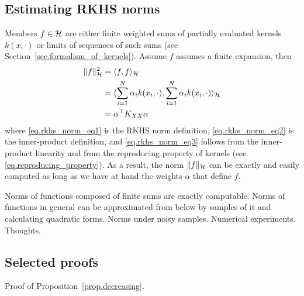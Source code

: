 \subsection{Estimating RKHS norms}

Members $f \in \mathcal{H}$ are either finite weighted sums of partially evaluated kernels $k(x,\cdot)$ or limits of sequences of such sums (see Section~\ref{sec.formalism_of_kernels}). Assume $f$ assumes a finite expansion, then
\begin{align}
	\Vert f \Vert_{\mathcal{H}}^2 &= \langle f, f \rangle_{\mathcal{H}} \label{eq.rkhs_norm_eq1} \\
	&= \langle \sum_{i=1}^N \alpha_i k(x_i,\cdot), \sum_{i=1}^N \alpha_i k(x_i,\cdot) \rangle_{\mathcal{H}} \label{eq.rkhs_norm_eq2} \\
	&= \alpha^\top K_{XX} \alpha \label{eq.rkhs_norm_eq3}
\end{align}
where \eqref{eq.rkhs_norm_eq1} is the RKHS norm definition, \eqref{eq.rkhs_norm_eq2} is the inner-product definition, and \eqref{eq.rkhs_norm_eq3} follows from the inner-product linearity and from the reproducing property of kernels (see \eqref{eq.reproducing_property}). As a result, the norm $\Vert f \Vert_{\mathcal{H}}$ can be exactly and easily computed as long as we have at hand the weights $\alpha$ that define $f$.

Norms of functions composed of finite sums are exactly computable. Norms of functions in general can be approximated from below by samples of it and calculating quadratic forms. Norms under noisy samples. Numerical experiments. Thoughts.

\subsection{Selected proofs}

\label{sec.selected_derivations}

Proof of Proposition~\ref{prop.decreasing}.

